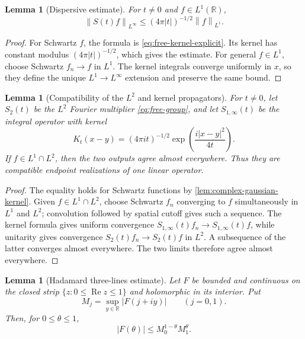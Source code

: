 \documentclass[11pt,oneside]{book}
\newtheorem{lemma}[theorem]{Lemma}
\theoremstyle{definition}
\theoremstyle{remark}
\newcommand{\R}{\mathbb R}
\newcommand{\1}{\mathbf 1}
\newcommand{\Rea}{\operatorname{Re}}
\newcommand{\norm}[1]{\left\lVert #1\right\rVert}
\begin{document}
\begin{lemma}[Dispersive estimate]\label{lem:dispersive-1d}
For $t\ne0$ and $f\in L^1(\R)$,
\[
  \norm{S(t)f}_{L^\infty}\le (4\pi|t|)^{-1/2}\norm f_{L^1}.
\]
\end{lemma}

\begin{proof}
For Schwartz $f$, the formula is \eqref{eq:free-kernel-explicit}.  Its
kernel has constant modulus $(4\pi|t|)^{-1/2}$, which gives the estimate.
For general $f\in L^1$, choose Schwartz $f_n\to f$ in $L^1$.  The kernel
integrals converge uniformly in $x$, so they define the unique
$L^1\to L^\infty$ extension and preserve the same bound.
\end{proof}

\begin{lemma}[Compatibility of the $L^2$ and kernel propagators]
\label{lem:propagator-compatibility}
For $t\ne0$, let $S_2(t)$ be the $L^2$ Fourier multiplier
\eqref{eq:free-group}, and let $S_{1,\infty}(t)$ be the integral operator with
kernel
\[
 K_t(x-y)=(4\pi it)^{-1/2}\exp\!\left(\frac{i|x-y|^2}{4t}\right).
\]
If $f\in L^1\cap L^2$, then the two outputs agree almost everywhere.  Thus
they are compatible endpoint realizations of one linear operator.
\end{lemma}

\begin{proof}
The equality holds for Schwartz functions by \cref{lem:complex-gaussian-kernel}.  Given $f\in L^1\cap L^2$, choose Schwartz $f_n$ converging
to $f$ simultaneously in $L^1$ and $L^2$; convolution followed by spatial
cutoff gives such a sequence.  The kernel formula gives uniform convergence
$S_{1,\infty}(t)f_n\to S_{1,\infty}(t)f$, while unitarity gives convergence
$S_2(t)f_n\to S_2(t)f$ in $L^2$.  A subsequence of the latter converges almost
everywhere.  The two limits therefore agree almost everywhere.
\end{proof}


\begin{lemma}[Hadamard three-lines estimate]\label{lem:three-lines-explicit}
Let $F$ be bounded and continuous on the closed strip
$\{z:0\le\Rea z\le1\}$ and holomorphic in its interior.  Put
\[
 M_j=\sup_{y\in\R}|F(j+iy)|\qquad(j=0,1).
\]
Then, for $0\le\theta\le1$,
\begin{equation}
 |F(\theta)|\le M_0^{1-\theta}M_1^\theta.          \label{eq:three-lines-explicit}
\end{equation}
\end{lemma}
\end{document}
